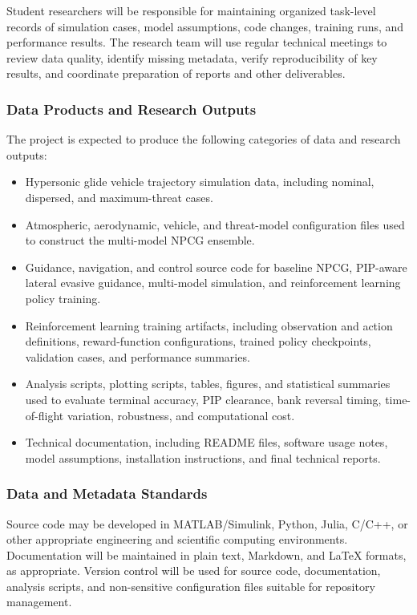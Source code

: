 Student researchers will be responsible for maintaining organized task-level records of simulation cases, model assumptions, code changes, training runs, and performance results. The research team will use regular technical meetings to review data quality, identify missing metadata, verify reproducibility of key results, and coordinate preparation of reports and other deliverables.

\subsubsection{Data Products and Research Outputs}

The project is expected to produce the following categories of data and research outputs:

\begin{itemize}
  \item Hypersonic glide vehicle trajectory simulation data, including nominal, dispersed, and maximum-threat cases.
  \item Atmospheric, aerodynamic, vehicle, and threat-model configuration files used to construct the multi-model NPCG ensemble.
  \item Guidance, navigation, and control source code for baseline NPCG, PIP-aware lateral evasive guidance, multi-model simulation, and reinforcement learning policy training.
  \item Reinforcement learning training artifacts, including observation and action definitions, reward-function configurations, trained policy checkpoints, validation cases, and performance summaries.
  \item Analysis scripts, plotting scripts, tables, figures, and statistical summaries used to evaluate terminal accuracy, PIP clearance, bank reversal timing, time-of-flight variation, robustness, and computational cost.
  \item Technical documentation, including README files, software usage notes, model assumptions, installation instructions, and final technical reports.
\end{itemize}

\subsubsection{Data and Metadata Standards}

Source code may be developed in MATLAB/Simulink, Python, Julia, C/C++, or other appropriate engineering and scientific computing environments. Documentation will be maintained in plain text, Markdown, and \LaTeX{} formats, as appropriate. Version control will be used for source code, documentation, analysis scripts, and non-sensitive configuration files suitable for repository management.

